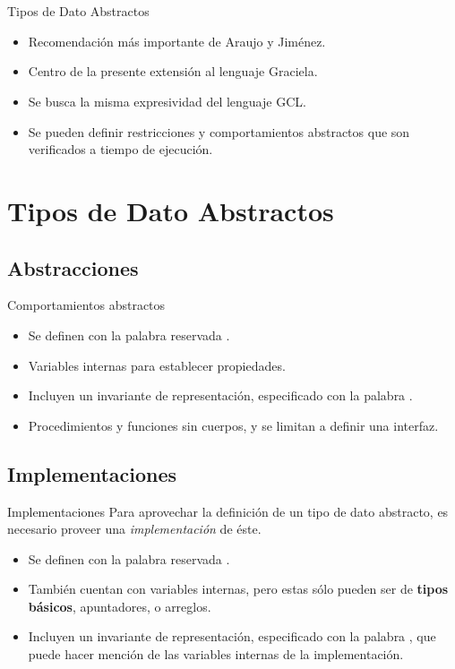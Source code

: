 \section*{ }

\begin{frame}{Tipos de Dato Abstractos}

\begin{itemize}
  \item Recomendación más importante de Araujo y Jiménez.
  \item Centro de la presente extensión al lenguaje Graciela.
  \item Se busca la misma expresividad del lenguaje GCL.
  \item Se pueden definir restricciones y comportamientos abstractos que son verificados a tiempo de ejecución.
\end{itemize}
\end{frame}

\section{Tipos de Dato Abstractos}

\subsection*{Abstracciones}

\begin{frame}{Comportamientos abstractos}
\begin{itemize}
  \item Se definen con la palabra reservada .
  \item Variables internas para establecer propiedades.
  \item Incluyen un invariante de representación, especificado con la palabra .
  \item Procedimientos y funciones sin cuerpos, y se limitan a definir una interfaz.
\end{itemize}
\end{frame}

\subsection*{Implementaciones}
\begin{frame}{Implementaciones}
Para aprovechar la definición de un tipo de dato abstracto, es necesario proveer una \textit{implementación} de éste.
\begin{itemize}
  \item Se definen con la palabra reservada .
  \item También cuentan con variables internas, pero estas sólo pueden ser de \textbf{tipos básicos}, apuntadores, o arreglos.
  \item Incluyen un invariante de representación, especificado con la palabra , que puede hacer mención de las variables internas de la implementación.
\end{itemize}
\end{frame}

